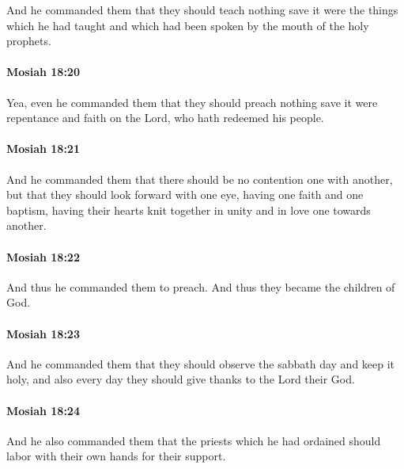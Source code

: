 			And he commanded them that they should teach nothing
			save it were the things which he had taught
			and which had been spoken by the mouth of the holy prophets.

		\paragraph{Mosiah 18:20} %
			\label{MOSIAH-18-20}

			Yea, even he commanded them that they should preach nothing
			save it were repentance and faith on the Lord, who hath redeemed his people.

		\paragraph{Mosiah 18:21} %
			\label{MOSIAH-18-21}

			And he commanded them that there should be no contention one with another,
			but that they should look forward with one eye,
			having one faith and one baptism,
			having their hearts knit together in unity and in love one towards another.

		\paragraph{Mosiah 18:22} %
			\label{MOSIAH-18-22}

			And thus he commanded them to preach.
			And thus they became the children of God.

		\paragraph{Mosiah 18:23} %
			\label{MOSIAH-18-23}

			And he commanded them
			that they should observe the sabbath day and keep it holy,
			and also every day they should give thanks to the Lord their God.

		\paragraph{Mosiah 18:24} %
			\label{MOSIAH-18-24}

			And he also commanded them that the priests which he had ordained
			should labor with their own hands for their support.

